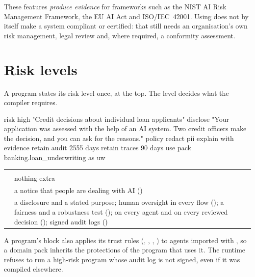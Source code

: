 \begin{ethics}
These features \emph{produce evidence} for frameworks such as the NIST AI Risk Management Framework, the EU AI Act and ISO/IEC~42001. Using \algolang{} does not by itself make a system compliant or certified: that still needs an organisation's own risk management, legal review and, where required, a conformity assessment.
\end{ethics}

\section{Risk levels}

A program states its risk level once, at the top. The level decides what the compiler requires.

\begin{algo}[title=enterprise-apps/bank-credit-onboarding/programs/loan\_decision.algo (head)]
risk high "Credit decisions about individual loan applicants"
disclose "Your application was assessed with the help of an AI system. Two credit officers make the decision, and you can ask for the reasons."
policy { redact pii  explain with evidence  retain audit 2555 days  retain traces 90 days }
use pack banking.loan_underwriting as uw
\end{algo}

\begin{center}
\small
\begin{tabularx}{\linewidth}{@{}L{2.2cm}Y@{}}
\toprule
{} & \\
\goldrule
{} & nothing extra\\
 & a  notice that people are dealing with AI ()\\
 & a disclosure and a stated purpose; human oversight in every flow (); a fairness and a robustness test ();  on every agent and  on every reviewed decision (); signed audit logs ()\\
\bottomrule
\end{tabularx}
\end{center}

A program's  block also applies its trust rules (, , , ) to agents imported with , so a domain pack inherits the protections of the program that uses it. The runtime refuses to run a high-risk program whose audit log is not signed, even if it was compiled elsewhere.

